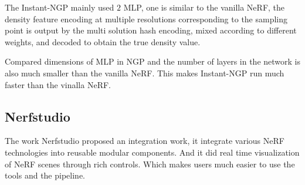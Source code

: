 The Instant-NGP mainly used $2$ MLP, one is similar to the vanilla NeRF,  the density feature encoding at multiple resolutions corresponding to the sampling point is output by the multi solution hash encoding, mixed according to different weights, and decoded to obtain the true density value.

Compared dimensions of MLP in NGP and the number of layers in the network is also much smaller than the vanilla NeRF. This makes Instant-NGP run much faster than the vinalla NeRF.

\subsection{Nerfstudio}
The work Nerfstudio \cite{nerfstudio} proposed an integration work, it integrate various NeRF technologies into reusable modular components. And it did real time visualization of NeRF scenes through rich controls. Which makes users much easier to use the tools and the pipeline.